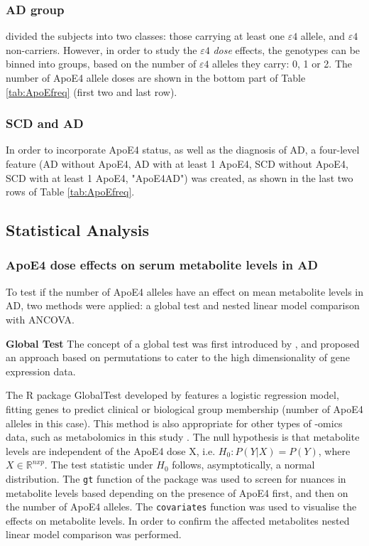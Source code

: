 \documentclass{amsart}
\begin{document}
\subsubsection{AD group}
\cite{deLeeuw2017Blood-basedDisease} divided the subjects into two classes: those carrying at least one $\varepsilon4$ allele, and $\varepsilon4$ non-carriers. However, in order to study the $\varepsilon4$ \textit{dose} effects, the genotypes can be binned into groups, based on the number of $\varepsilon4$ alleles they carry: 0, 1 or 2. The number of ApoE4 allele doses are shown in the bottom part of Table \ref{tab:ApoEfreq} (first two and last row).

\subsubsection{SCD and AD}
In order to incorporate ApoE4 status, as well as the diagnosis of AD, a four-level feature (AD without ApoE4, AD with at least 1 ApoE4, SCD without ApoE4, SCD with at least 1 ApoE4, "ApoE4AD") was created, as shown in the last two rows of Table \ref{tab:ApoEfreq}.

\subsection{Statistical Analysis} \label{stats}
\subsubsection{ApoE4 dose effects on serum metabolite levels in AD} \label{rq1}
To test if the number of ApoE4 alleles have an effect on mean metabolite levels in AD, two methods were applied: a global test and nested linear model comparison with ANCOVA.

\leavevmode\newline\textbf{Global Test}\hspace{.25cm} The concept of a global test was first introduced by \citeauthor{Simon2004DesignHealth}, and proposed an approach based on permutations to cater to the high dimensionality of gene expression data.

The R package \textsf{GlobalTest} \cite{Goeman2004AOutcome, Goeman2006TestingAlternative, Goeman2023ThePackage} developed by \citeauthor{Goeman2004AOutcome} features a logistic regression model, fitting genes to predict clinical or biological group membership (number of ApoE4 alleles in this case). This method is also appropriate for other types of -omics data, such as metabolomics in this study \cite{Goeman2023ThePackage}. The null hypothesis is that metabolite levels are independent of the ApoE4 dose X, i.e. $H_0 : P(Y|X) = P(Y)$, where $X \in \mathbb{R}^{n x p}$. The test statistic under $H_0$ follows, asymptotically, a normal distribution. The \texttt{gt} function of the package was used to screen for nuances in metabolite levels based depending on the presence of ApoE4 first, and then on the number of ApoE4 alleles. The \texttt{covariates} function was used to visualise the effects on metabolite levels. In order to confirm the affected metabolites nested linear model comparison was performed.
\end{document}
